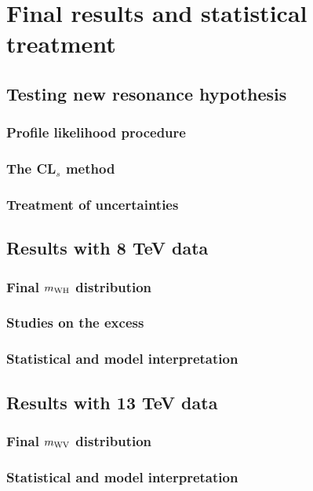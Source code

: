 \chapter{Final results and statistical treatment}
\label{ch:results}

\section{Testing new resonance hypothesis}
\subsection{Profile likelihood procedure}
\subsection{The CL$_{s}$ method}
\subsection{Treatment of uncertainties}

\section{Results with 8 TeV data}
\subsection{Final $m_{\rm WH}$ distribution}
\subsection{Studies on the excess}
\subsection{Statistical and model interpretation}

\section{Results with 13 TeV data}
\subsection{Final $m_{\rm WV}$ distribution}
\subsection{Statistical and model interpretation}
